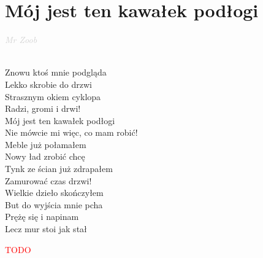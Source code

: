 \documentclass[a5paper, 10pt]{book}
\begin{document}
\newpage
\section{Mój jest ten kawałek podłogi}\textcolor{lightgray}{\textit{Mr Zoob}}\\~\\
\begin{minipage}[t]{0.8\textwidth}
  Znowu ktoś mnie podgląda\\
  Lekko skrobie do drzwi\\
  Strasznym okiem cyklopa\\
  Radzi, gromi i drwi!\\

  \hspace*{5mm}Mój jest ten kawałek podłogi\\
  \hspace*{5mm}Nie mówcie mi więc, co mam robić!\\

  Meble już połamałem\\
  Nowy ład zrobić chcę\\
  Tynk ze ścian już zdrapałem\\
  Zamurować czas drzwi!\\

  Wielkie dzieło skończyłem\\
  But do wyjścia mnie pcha\\
  Prężę się i napinam\\
  Lecz mur stoi jak stał\\

\end{minipage}
\begin{minipage}[t]{0.2\textwidth}
  \textcolor{red}{TODO}\\
\end{minipage}

\newpage
\end{document}
